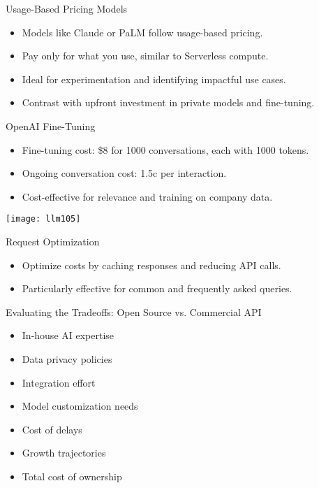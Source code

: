 \begin{frame}[fragile]{Usage-Based Pricing Models}
  \begin{itemize}
    \item Models like Claude or PaLM follow usage-based pricing.
    \item Pay only for what you use, similar to Serverless compute.
    \item Ideal for experimentation and identifying impactful use cases.
    \item Contrast with upfront investment in private models and fine-tuning.
  \end{itemize}
\end{frame}

\begin{frame}[fragile]{OpenAI Fine-Tuning}
  \begin{itemize}
    \item Fine-tuning cost: \$8 for 1000 conversations, each with 1000 tokens.
    \item Ongoing conversation cost: 1.5c per interaction.
    \item Cost-effective for relevance and training on company data.
  \end{itemize}
  
\begin{center}
\texttt{[image: llm105]}
\end{center}  
\end{frame}

\begin{frame}[fragile]{Request Optimization}
  \begin{itemize}
    \item Optimize costs by caching responses and reducing API calls.
    \item Particularly effective for common and frequently asked queries.
  \end{itemize}
\end{frame}



\begin{frame}[fragile]{Evaluating the Tradeoffs: Open Source vs. Commercial API}
  \begin{itemize}
    \item In-house AI expertise
    \item Data privacy policies
    \item Integration effort
    \item Model customization needs
    \item Cost of delays
    \item Growth trajectories
    \item Total cost of ownership
  \end{itemize}
\end{frame}

